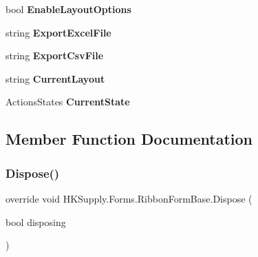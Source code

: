 \begin{DoxyCompactItemize}
bool {\bfseries Enable\+Layout\+Options}
\item 
\mbox{\label{class_h_k_supply_1_1_forms_1_1_ribbon_form_base_ae1067b098f733b9d83a196950c033965}} 
string {\bfseries Export\+Excel\+File}
\item 
\mbox{\label{class_h_k_supply_1_1_forms_1_1_ribbon_form_base_a4c49d0366a5aefcbfeb9ffc8a73d7eee}} 
string {\bfseries Export\+Csv\+File}
\item 
\mbox{\label{class_h_k_supply_1_1_forms_1_1_ribbon_form_base_ab9d07b216d885241427a38a34ac0e63e}} 
string {\bfseries Current\+Layout}
\item 
\mbox{\label{class_h_k_supply_1_1_forms_1_1_ribbon_form_base_ac278443a5e6b29829ff8c5744f202471}} 
Actions\+States {\bfseries Current\+State}
\end{DoxyCompactItemize}


\subsection{Member Function Documentation}
\mbox{\label{class_h_k_supply_1_1_forms_1_1_ribbon_form_base_a550191c92b26d28e11d1f68f66f57d30}} 
\subsubsection{\texorpdfstring{Dispose()}{Dispose()}}
{\footnotesize\ttfamily override void H\+K\+Supply.\+Forms.\+Ribbon\+Form\+Base.\+Dispose (\begin{DoxyParamCaption}\item[{bool}]{disposing }\end{DoxyParamCaption})\hspace{0.3cm}{\ttfamily [protected]}}



